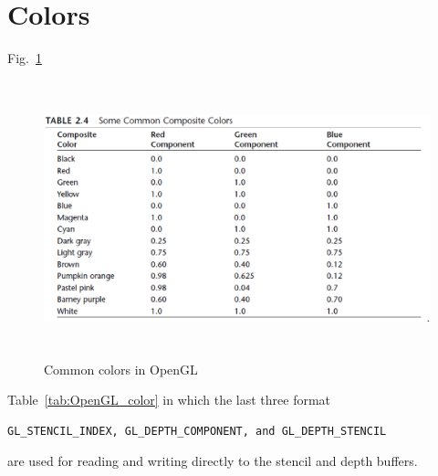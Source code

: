 \section{Colors}
\label{sec:colors}

Fig.~\ref{fig:common_colors}

\begin{figure}[hbt]
  \centerline{\includegraphics[height=8cm,
    angle=0]{./images/common_colors.eps}}
\caption{Common colors in OpenGL}
\label{fig:common_colors}
\end{figure}

Table~\ref{tab:OpenGL_color} in which the last three format
\begin{verbatim}
GL_STENCIL_INDEX, GL_DEPTH_COMPONENT, and GL_DEPTH_STENCIL
\end{verbatim}
are used for reading and writing directly to the stencil and depth
buffers.

